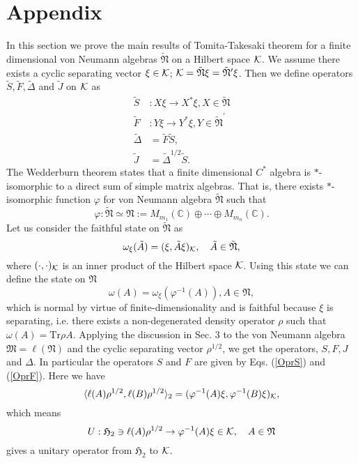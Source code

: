 \section{Appendix}
In this section we prove the main results of Tomita-Takesaki theorem for a finite dimensional
von Neumann algebras $\tilde{\mathfrak{N}}$ on a Hilbert space $\cal{K}$.
We assume there exists a cyclic separating vector $\xi\in \cal{K}$;
$\cal{K}=\tilde{\mathfrak{N}}\xi=\tilde{\mathfrak{N}}^\prime\xi$.
Then we define operators $\tilde{S},\tilde{F},\tilde{\Delta}$ and $\tilde{J}$ on $\cal{K}$ as
\begin{equation}
\begin{split}
\tilde{S}&:X\xi \to X^\ast \xi , X\in \tilde{\mathfrak{N}}\\
\tilde{F}&:Y\xi \to Y^\ast \xi , Y\in \tilde{\mathfrak{N}}^\prime\\
\tilde{\Delta}&=\tilde{F}\tilde{S},\\
\tilde{J}&=\tilde{\Delta}^{1/2}\tilde{S}.
\end{split}
\end{equation}
The Wedderburn theorem states that a finite dimensional $C^{\ast}$ algebra is  $\ast$-isomorphic to a direct sum of simple matrix algebras. That is, there exists $\ast$-isomorphic function $\varphi$ for von Neumann algebra $\tilde{\mathfrak{N}}$ such that
$$
\varphi:\tilde{\mathfrak{N}}\simeq \mathfrak{N}:=M_{m_1}(\mathbb{C})\oplus \cdots \oplus M_{m_n}(\mathbb{C}).
$$
Let us consider the faithful state on $\tilde{\mathfrak{N}}$ as
$$
\omega_\xi(\tilde{A})=(\xi,\tilde{A}\xi)_{\cal K},\quad \tilde{A}\in \tilde{\mathfrak{N}},
$$
where $(\cdot,\cdot)_{\cal K}$ is an inner product of the Hilbert space ${\cal K}$.
Using this state we can define the state on $\mathfrak{N}$
$$
\omega(A)=\omega_\xi(\varphi^{-1}(A)),A\in \mathfrak{N},
$$
which is normal by virtue of finite-dimensionality and is faithful because $\xi$ is separating, i.e. there exists a non-degenerated density operator $\rho$ such that $\omega(A)=\mbox{Tr}\rho A$.
Applying the discussion in Sec. 3 to the von Neumann algebra $\mathfrak{M}=\ell(\mathfrak{N})$ and 
the cyclic separating vector $\rho^{1/2}$, we get
the operators, $S, F, J$ and $\Delta$.
In particular the operators $S$ and $F$ are given by Eqs. (\ref{OprS}) and (\ref{OprF}).
Here we have
$$
\langle \ell(A)\rho^{1/2},\ell( B)\rho^{1/2}\rangle_2=(\varphi^{-1}(A)\xi,\varphi^{-1}(B)\xi)_{\cal K},
$$
which means
$$
U:\mathfrak{H}_2\ni\ell(A)\rho^{1/2}\to \varphi^{-1}(A)\xi\in {\cal K}, \quad A\in \mathfrak{N}
$$
gives a unitary operator from $\mathfrak{H}_2$ to ${\cal K}$.
